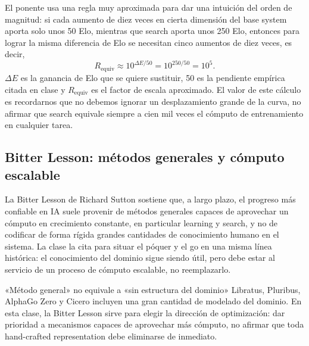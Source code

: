 El ponente usa una regla muy aproximada para dar una intuición del orden de magnitud: si cada aumento de diez veces en cierta dimensión del base system aporta solo unos 50 Elo, mientras que search aporta unos 250 Elo, entonces para lograr la misma diferencia de Elo se necesitan cinco aumentos de diez veces, es decir,
\begin{equation}
R_{\text{equiv}}
\approx 10^{\Delta E/50}
=10^{250/50}=10^5.
\end{equation}
$\Delta E$ es la ganancia de Elo que se quiere sustituir, 50 es la pendiente empírica citada en clase y $R_{\text{equiv}}$ es el factor de escala aproximado. El valor de este cálculo es recordarnos que no debemos ignorar un desplazamiento grande de la curva, no afirmar que search equivale siempre a cien mil veces el cómputo de entrenamiento en cualquier tarea.


\subsection{Bitter Lesson: métodos generales y cómputo escalable}

La Bitter Lesson de Richard Sutton sostiene que, a largo plazo, el progreso más confiable en IA suele provenir de métodos generales capaces de aprovechar un cómputo en crecimiento constante, en particular learning y search, y no de codificar de forma rígida grandes cantidades de conocimiento humano en el sistema. La clase la cita para situar el póquer y el go en una misma línea histórica: el conocimiento del dominio sigue siendo útil, pero debe estar al servicio de un proceso de cómputo escalable, no reemplazarlo.


\begin{warningbox}{«Método general» no equivale a «sin estructura del dominio»}
Libratus, Pluribus, AlphaGo Zero y Cicero incluyen una gran cantidad de modelado del dominio. En esta clase, la Bitter Lesson sirve para elegir la dirección de optimización: dar prioridad a mecanismos capaces de aprovechar más cómputo, no afirmar que toda hand-crafted representation debe eliminarse de inmediato.
\end{warningbox}

